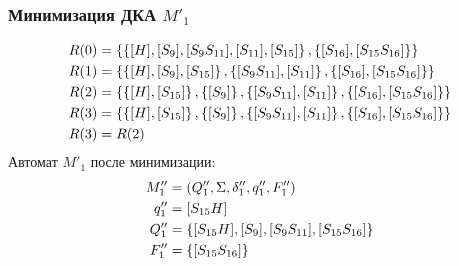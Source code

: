 \subsubsection{Минимизация ДКА \(M'_1\)}
\begin{align*}
	R(0) & = \left\{\left\{[H], [S_9], [S_9S_{11}],[S_{11}], [S_{15}]\right\}, \left\{[S_{16}], [S_{15}S_{16}]\right\} \right\}              \\
	R(1) & = \left\{\left\{[H], [S_9], [S_{15}]\right\}, \left\{[S_9S_{11}],[S_{11}]\right\}, \left\{[S_{16}], [S_{15}S_{16}]\right\} \right\}        \\
	R(2) & = \left\{\left\{[H], [S_{15}]\right\}, \left\{[S_9]\right\},  \left\{[S_9S_{11}],[S_{11}]\right\}, \left\{[S_{16}], [S_{15}S_{16}]\right\} \right\} \\
	R(3) & = \left\{\left\{[H], [S_{15}]\right\}, \left\{[S_9]\right\},  \left\{[S_9S_{11}],[S_{11}]\right\}, \left\{[S_{16}], [S_{15}S_{16}]\right\} \right\} \\
	R(3) & = R(2)
\end{align*}
Автомат \(M'_1\) после минимизации:
\begin{align*}
	M''_1 & = \left(Q''_1, \Sigma, \delta''_1, q''_1, F''_1\right)       \\
	q''_1 & = [S_{15}H]                                           \\
	Q''_1 & = \left\{[S_{15}H], [S_9], [S_9S_{11}], [S_{15}S_{16}]\right\} \\
	F''_1 & = \left\{[S_{15}S_{16}]\right\}
\end{align*}
